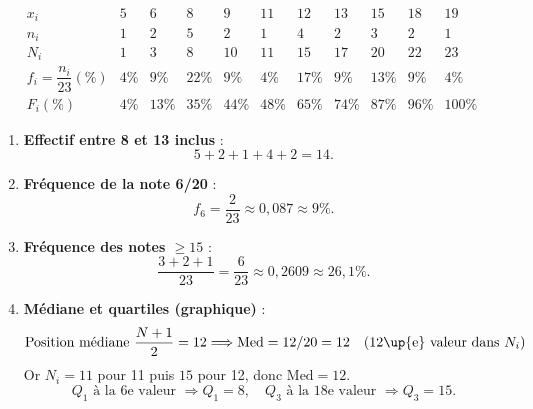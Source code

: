 \documentclass{article}
\theoremstyle{definition}
\begin{document}
\[
  \begin{array}{c|cccccccccc}
    x_i               & 5 & 6 & 8 & 9 & 11 & 12 & 13 & 15 & 18 & 19 \\ \hline
    n_i               & 1 & 2 & 5 & 2 &  1 &  4 &  2 &  3 &  2 &  1 \\ \hline
    N_i               & 1 & 3 & 8 & 10 & 11 & 15 & 17 & 20 & 22 & 23 \\ \hline
    f_i=\dfrac{n_i}{23}(\%)
    & 4\% & 9\% & 22\% & 9\% & 4\% & 17\% & 9\% & 13\% & 9\% & 4\% \\ \hline
    F_i(\%)
    &  4\% & 13\% & 35\% & 44\% & 48\% & 65\% & 74\% & 87\% & 96\% & 100\%
  \end{array}
\]

\begin{enumerate}
  \item \textbf{Effectif entre 8 et 13 inclus} :
    \[
      5 + 2 + 1 + 4 + 2 = 14.
    \]

  \item \textbf{Fréquence de la note 6/20} :
    \[
      f_6 = \frac{2}{23}\approx 0{,}087 \approx 9\%.
    \]

  \item \textbf{Fréquence des notes $\ge15$} :
    \[
      \frac{3 + 2 + 1}{23} = \frac{6}{23}\approx 0{,}2609 \approx 26{,}1\%.
    \]

  \item \textbf{Médiane et quartiles (graphique)} :
    \[
      \text{Position médiane } \frac{N+1}{2} = 12\Longrightarrow\mathrm{Med}=12/20=12
      \quad(\text{12\up{e} valeur dans }N_i)
    \]
    Or $N_i=11$ pour 11 puis $15$ pour 12, donc $\mathrm{Med}=12$.
    \[
      Q_1\text{ à la }6\text{e valeur }\Longrightarrow Q_1=8,
      \quad
      Q_3\text{ à la }18\text{e valeur }\Longrightarrow Q_3=15.
    \]
\end{enumerate}
\end{document}
